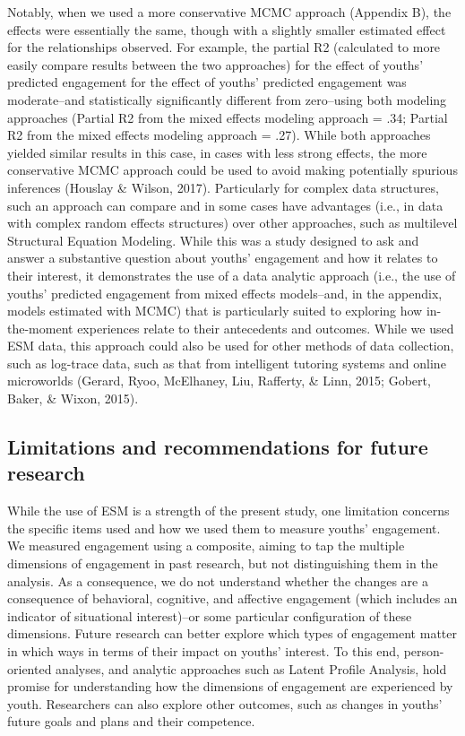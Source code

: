 \documentclass[man]{apa6}
\theoremstyle{definition}
\theoremstyle{definition}
\theoremstyle{definition}
\theoremstyle{remark}
\begin{document}
Notably, when we used a more conservative MCMC approach (Appendix B),
the effects were essentially the same, though with a slightly smaller
estimated effect for the relationships observed. For example, the
partial R2 (calculated to more easily compare results between the two
approaches) for the effect of youths' predicted engagement for the
effect of youths' predicted engagement was moderate--and statistically
significantly different from zero--using both modeling approaches
(Partial R2 from the mixed effects modeling approach = .34; Partial R2
from the mixed effects modeling approach = .27). While both approaches
yielded similar results in this case, in cases with less strong effects,
the more conservative MCMC approach could be used to avoid making
potentially spurious inferences (Houslay \& Wilson, 2017). Particularly
for complex data structures, such an approach can compare and in some
cases have advantages (i.e., in data with complex random effects
structures) over other approaches, such as multilevel Structural
Equation Modeling. While this was a study designed to ask and answer a
substantive question about youths' engagement and how it relates to
their interest, it demonstrates the use of a data analytic approach
(i.e., the use of youths' predicted engagement from mixed effects
models--and, in the appendix, models estimated with MCMC) that is
particularly suited to exploring how in-the-moment experiences relate to
their antecedents and outcomes. While we used ESM data, this approach
could also be used for other methods of data collection, such as
log-trace data, such as that from intelligent tutoring systems and
online microworlds (Gerard, Ryoo, McElhaney, Liu, Rafferty, \& Linn,
2015; Gobert, Baker, \& Wixon, 2015).

\subsection{Limitations and recommendations for future
research}\label{limitations-and-recommendations-for-future-research}

While the use of ESM is a strength of the present study, one limitation
concerns the specific items used and how we used them to measure youths'
engagement. We measured engagement using a composite, aiming to tap the
multiple dimensions of engagement in past research, but not
distinguishing them in the analysis. As a consequence, we do not
understand whether the changes are a consequence of behavioral,
cognitive, and affective engagement (which includes an indicator of
situational interest)--or some particular configuration of these
dimensions. Future research can better explore which types of engagement
matter in which ways in terms of their impact on youths' interest. To
this end, person-oriented analyses, and analytic approaches such as
Latent Profile Analysis, hold promise for understanding how the
dimensions of engagement are experienced by youth. Researchers can also
explore other outcomes, such as changes in youths' future goals and
plans and their competence.
\end{document}
